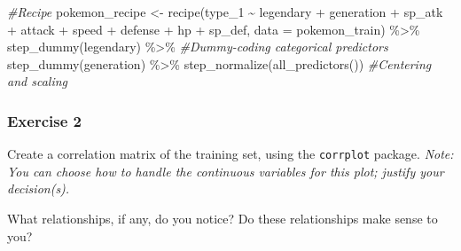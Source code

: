 \documentclass[
]{article}
\newenvironment{Shaded}{\begin{snugshade}}{\end{snugshade}}
\newcommand{\AttributeTok}[1]{\textcolor[rgb]{0.77,0.63,0.00}{#1}}
\newcommand{\CommentTok}[1]{\textcolor[rgb]{0.56,0.35,0.01}{\textit{#1}}}
\newcommand{\FunctionTok}[1]{\textcolor[rgb]{0.00,0.00,0.00}{#1}}
\newcommand{\NormalTok}[1]{#1}
\newcommand{\OtherTok}[1]{\textcolor[rgb]{0.56,0.35,0.01}{#1}}
\newcommand{\SpecialCharTok}[1]{\textcolor[rgb]{0.00,0.00,0.00}{#1}}
\begin{document}
\begin{Shaded}
\begin{Highlighting}[]
\CommentTok{\#Recipe}
\NormalTok{pokemon\_recipe }\OtherTok{\textless{}{-}} \FunctionTok{recipe}\NormalTok{(type\_1 }\SpecialCharTok{\textasciitilde{}}\NormalTok{ legendary }\SpecialCharTok{+}\NormalTok{ generation }\SpecialCharTok{+}\NormalTok{ sp\_atk }\SpecialCharTok{+}\NormalTok{ attack }\SpecialCharTok{+}\NormalTok{ speed }\SpecialCharTok{+}\NormalTok{ defense }\SpecialCharTok{+}\NormalTok{ hp }\SpecialCharTok{+}\NormalTok{ sp\_def, }\AttributeTok{data =}\NormalTok{ pokemon\_train) }\SpecialCharTok{\%\textgreater{}\%}
  \FunctionTok{step\_dummy}\NormalTok{(legendary) }\SpecialCharTok{\%\textgreater{}\%}    \CommentTok{\#Dummy{-}coding categorical predictors}
  \FunctionTok{step\_dummy}\NormalTok{(generation) }\SpecialCharTok{\%\textgreater{}\%}
  \FunctionTok{step\_normalize}\NormalTok{(}\FunctionTok{all\_predictors}\NormalTok{()) }\CommentTok{\#Centering and scaling}
\end{Highlighting}
\end{Shaded}

\hypertarget{exercise-2}{%
\subsubsection{Exercise 2}\label{exercise-2}}

Create a correlation matrix of the training set, using the
\texttt{corrplot} package. \emph{Note: You can choose how to handle the
continuous variables for this plot; justify your decision(s).}

What relationships, if any, do you notice? Do these relationships make
sense to you?
\end{document}
